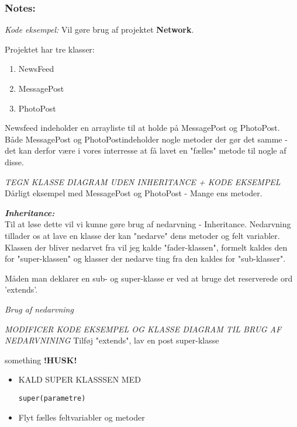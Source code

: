 \documentclass[a4paper,12pt]{article}
\begin{document}
\subsubsection*{Notes:}
\textit{Kode eksempel:}
Vil gøre brug af projektet \textbf{Network}.

Projektet har tre klasser:
\begin{enumerate}
    \item NewsFeed
    \item MessagePost
    \item PhotoPost
\end{enumerate}

Newsfeed indeholder en arrayliste til at holde på MessagePost og PhotoPost.
Både MessagePost og PhotoPostindeholder nogle metoder der gør det samme - 
det kan derfor være i vores interresse at få lavet en "fælles" metode til nogle
af disse.

\begin{center}
    \textit{TEGN KLASSE DIAGRAM UDEN INHERITANCE + KODE EKSEMPEL} \\
    Dårligt eksempel med MessagePost og PhotoPost - Mange ens metoder.
\end{center}

\textbf{\textit{Inheritance:}} \\

Til at løse dette vil vi kunne gøre brug af nedarvning - Inheritance. Nedarvning tillader os at lave en klasse der kan "nedarve" dens metoder og felt variabler. Klassen der bliver nedarvet fra vil jeg kalde "fader-klassen", formelt kaldes den for "super-klassen" og klasser der nedarve ting fra den kaldes for "sub-klasser". 

Måden man deklarer en sub- og super-klasse er ved at bruge det reserverede ord 'extends'.


\noindent\textit{Brug af nedarvning} \\
\begin{center}
    \textit{MODIFICER KODE EKSEMPEL OG KLASSE DIAGRAM TIL BRUG AF NEDARVNINING}
    Tilføj "extends", lav en post super-klasse 
\end{center}
something
\textbf{!HUSK!}
\begin{itemize}
    \item KALD SUPER KLASSSEN MED \begin{verbatim}super(parametre)\end{verbatim}
    \item Flyt fælles feltvariabler og metoder
\end{itemize}
\end{document}
